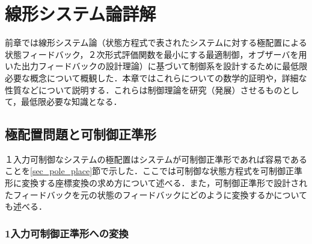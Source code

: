
\chapter{線形システム論詳解}

前章では線形システム論（状態方程式で表されたシステムに対する極配置による状態フィードバック，２次形式評価関数を最小にする最適制御，オブザーバを用いた出力フィードバックの設計理論）に基づいて制御系を設計するために最低限必要な概念について概観した．本章ではこれらについての数学的証明や，詳細な性質などについて説明する．これらは制御理論を研究（発展）させるものとして，最低限必要な知識となる．



\section{極配置問題と可制御正準形 \label{sec_c_canonical}}
１入力可制御なシステムの極配置はシステムが可制御正準形であれば容易であることを\ref{sec_pole_place}節で示した．ここでは可制御な状態方程式を可制御正準形に変換する座標変換の求め方について述べる．また，可制御正準形で設計されたフィードバックを元の状態のフィードバックにどのように変換するかについても述べる．

\subsection{1入力可制御正準形への変換}

